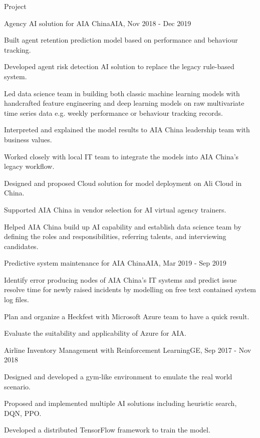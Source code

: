 \documentclass{resume} %
\begin{document}
\begin{rSection}{Project}
\begin{rSubsection}{Agency AI solution for AIA China}{}{AIA, Nov 2018 - Dec 2019}{}
\item Built agent retention prediction model based on performance and behaviour tracking.
\item Developed agent risk detection AI solution to replace the legacy rule-based system.
\item Led data science team in building both classic machine learning models with handcrafted feature engineering and deep learning models on raw multivariate time series data e.g. weekly performance or behaviour tracking records.
\item Interpreted and explained the model results to AIA China leadership team with business values.
\item Worked closely with local IT team to integrate the models into AIA China's legacy workflow.
\item Designed and proposed Cloud solution for model deployment on Ali Cloud in China.
\item Supported AIA China in vendor selection for AI virtual agency trainers.
\item Helped AIA China build up AI capability and establish data science team by defining the roles and responsibilities, referring talents, and interviewing candidates.
\end{rSubsection}


\begin{rSubsection}{Predictive system maintenance for AIA China}{}{AIA, Mar 2019 - Sep 2019}{}
\item Identify error producing nodes of AIA China's IT systems and predict issue resolve time for newly raised incidents by modelling on free text contained system log files.
\item Plan and organize a Heckfest with Microsoft Azure team to have a quick result.
\item Evaluate the suitability and applicability of Azure for AIA. 
\end{rSubsection}


\begin{rSubsection}{Airline Inventory Management with Reinforcement Learning}{}{GE, Sep 2017 - Nov 2018}{}
\item Designed and developed a gym-like environment to emulate the real world scenario.
\item Proposed and implemented multiple AI solutions including heuristic search, DQN, PPO.
\item Developed a distributed TensorFlow framework to train the model.
\end{rSubsection}


\end{rSection}
\end{document}
